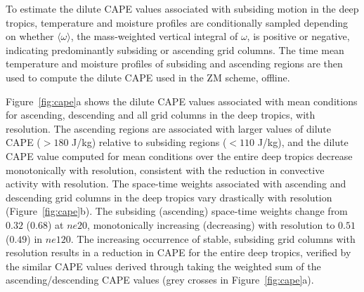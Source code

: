 \documentclass[times]{qjrms4}
\begin{document}
To estimate the dilute CAPE values associated with subsiding motion in the deep tropics, temperature and moisture profiles are conditionally sampled depending on whether $\langle \omega \rangle$, the mass-weighted vertical integral of $\omega$, is positive or negative, indicating predominantly subsiding or ascending grid columns. The time mean temperature and moisture profiles of subsiding and ascending regions are then used to compute the dilute CAPE used in the ZM scheme, offline. 

Figure~\ref{fig:cape}a shows the dilute CAPE values associated with mean conditions for ascending, descending and all grid columns in the deep tropics, with resolution. The ascending regions are associated with larger values of dilute CAPE ($>180$ J/kg) relative to subsiding regions ($<110$ J/kg), and the dilute CAPE value computed for mean conditions over the entire deep tropics decrease monotonically with resolution, consistent with the reduction in convective activity with resolution. The space-time weights associated with ascending and descending grid columns in the deep tropics vary drastically with resolution (Figure~\ref{fig:cape}b). The subsiding (ascending) space-time weights change from $0.32$ ($0.68$) at $ne20$, monotonically increasing (decreasing) with resolution to $0.51$ ($0.49$) in $ne120$. The increasing occurrence of stable, subsiding grid columns with resolution results in a reduction in CAPE for the entire deep tropics, verified by the similar CAPE values derived through taking the weighted sum of the ascending/descending CAPE values (grey crosses in Figure~\ref{fig:cape}a).
\end{document}
